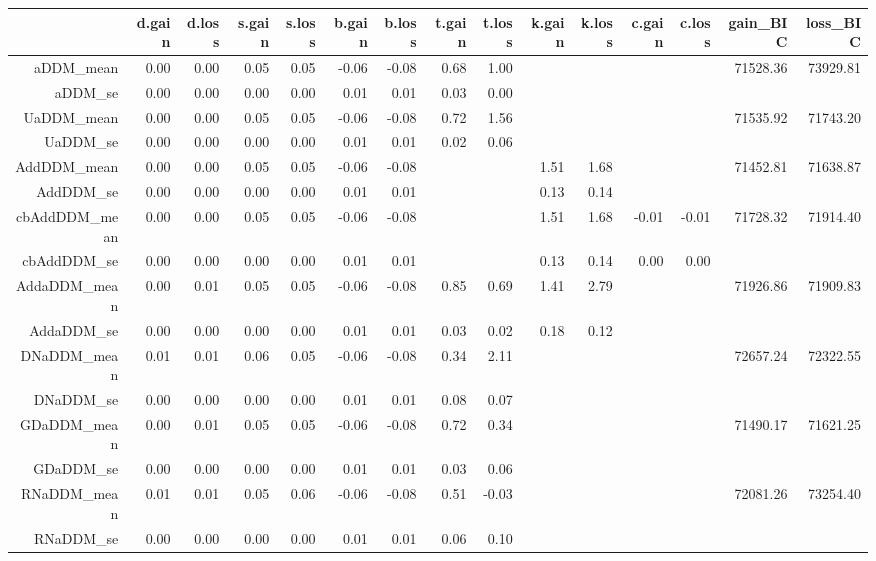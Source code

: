 \begin{table}[ht]
\centering
\begin{tabular}{rrrrrrrrrrrrrrr}
  \hline
 & d.gain & d.loss & s.gain & s.loss & b.gain & b.loss & t.gain & t.loss & k.gain & k.loss & c.gain & c.loss & gain\_BIC & loss\_BIC \\ 
  \hline
aDDM\_mean & 0.00 & 0.00 & 0.05 & 0.05 & -0.06 & -0.08 & 0.68 & 1.00 &  &  &  &  & 71528.36 & 73929.81 \\ 
  aDDM\_se & 0.00 & 0.00 & 0.00 & 0.00 & 0.01 & 0.01 & 0.03 & 0.00 &  &  &  &  &  &  \\ 
  UaDDM\_mean & 0.00 & 0.00 & 0.05 & 0.05 & -0.06 & -0.08 & 0.72 & 1.56 &  &  &  &  & 71535.92 & 71743.20 \\ 
  UaDDM\_se & 0.00 & 0.00 & 0.00 & 0.00 & 0.01 & 0.01 & 0.02 & 0.06 &  &  &  &  &  &  \\ 
  AddDDM\_mean & 0.00 & 0.00 & 0.05 & 0.05 & -0.06 & -0.08 &  &  & 1.51 & 1.68 &  &  & 71452.81 & 71638.87 \\ 
  AddDDM\_se & 0.00 & 0.00 & 0.00 & 0.00 & 0.01 & 0.01 &  &  & 0.13 & 0.14 &  &  &  &  \\ 
  cbAddDDM\_mean & 0.00 & 0.00 & 0.05 & 0.05 & -0.06 & -0.08 &  &  & 1.51 & 1.68 & -0.01 & -0.01 & 71728.32 & 71914.40 \\ 
  cbAddDDM\_se & 0.00 & 0.00 & 0.00 & 0.00 & 0.01 & 0.01 &  &  & 0.13 & 0.14 & 0.00 & 0.00 &  &  \\ 
  AddaDDM\_mean & 0.00 & 0.01 & 0.05 & 0.05 & -0.06 & -0.08 & 0.85 & 0.69 & 1.41 & 2.79 &  &  & 71926.86 & 71909.83 \\ 
  AddaDDM\_se & 0.00 & 0.00 & 0.00 & 0.00 & 0.01 & 0.01 & 0.03 & 0.02 & 0.18 & 0.12 &  &  &  &  \\ 
  DNaDDM\_mean & 0.01 & 0.01 & 0.06 & 0.05 & -0.06 & -0.08 & 0.34 & 2.11 &  &  &  &  & 72657.24 & 72322.55 \\ 
  DNaDDM\_se & 0.00 & 0.00 & 0.00 & 0.00 & 0.01 & 0.01 & 0.08 & 0.07 &  &  &  &  &  &  \\ 
  GDaDDM\_mean & 0.00 & 0.01 & 0.05 & 0.05 & -0.06 & -0.08 & 0.72 & 0.34 &  &  &  &  & 71490.17 & 71621.25 \\ 
  GDaDDM\_se & 0.00 & 0.00 & 0.00 & 0.00 & 0.01 & 0.01 & 0.03 & 0.06 &  &  &  &  &  &  \\ 
  RNaDDM\_mean & 0.01 & 0.01 & 0.05 & 0.06 & -0.06 & -0.08 & 0.51 & -0.03 &  &  &  &  & 72081.26 & 73254.40 \\ 
  RNaDDM\_se & 0.00 & 0.00 & 0.00 & 0.00 & 0.01 & 0.01 & 0.06 & 0.10 &  &  &  &  &  &  \\ 

\end{tabular}
\end{table}
